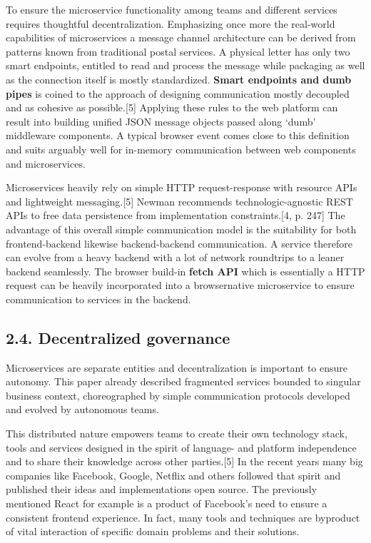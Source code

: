 \documentclass[]{article}
\begin{document}
To ensure the microservice functionality among teams and different
services requires thoughtful decentralization. Emphasizing once more the
real-world capabilities of microservices a message channel architecture
can be derived from patterns known from traditional postal services. A
physical letter has only two smart endpoints, entitled to read and
process the message while packaging as well as the connection itself is
mostly standardized. \textbf{Smart endpoints and dumb pipes} is coined
to the approach of designing communication mostly decoupled and as
cohesive as possible.{[}5{]} Applying these rules to the web platform
can result into building unified JSON message objects passed along
`dumb' middleware components. A typical browser event comes close to
this definition and suits arguably well for in-memory communication
between web components and microservices.

Microservices heavily rely on simple HTTP request-response with resource
APIs and lightweight messaging.{[}5{]} Newman recommends
technologic-agnostic REST APIs to free data persistence from
implementation constraints.{[}4, p. 247{]} The advantage of this overall
simple communication model is the suitability for both frontend-backend
likewise backend-backend communication. A service therefore can evolve
from a heavy backend with a lot of network roundtrips to a leaner
backend seamlessly. The browser build-in \textbf{fetch API} which is
essentially a HTTP request can be heavily incorporated into a
browsernative microservice to ensure communication to services in the
backend.

\subsection{2.4. Decentralized
governance}\label{decentralized-governance}

Microservices are separate entities and decentralization is important to
ensure autonomy. This paper already described fragmented services
bounded to singular business context, choreographed by simple
communication protocols developed and evolved by autonomous teams.

This distributed nature empowers teams to create their own technology
stack, tools and services designed in the spirit of language- and
platform independence and to share their knowledge across other
parties.{[}5{]} In the recent years many big companies like Facebook,
Google, Netflix and others followed that spirit and published their
ideas and implementations open source. The previously mentioned React
for example is a product of Facebook's need to ensure a consistent
frontend experience. In fact, many tools and techniques are byproduct of
vital interaction of specific domain problems and their solutions.
\end{document}
